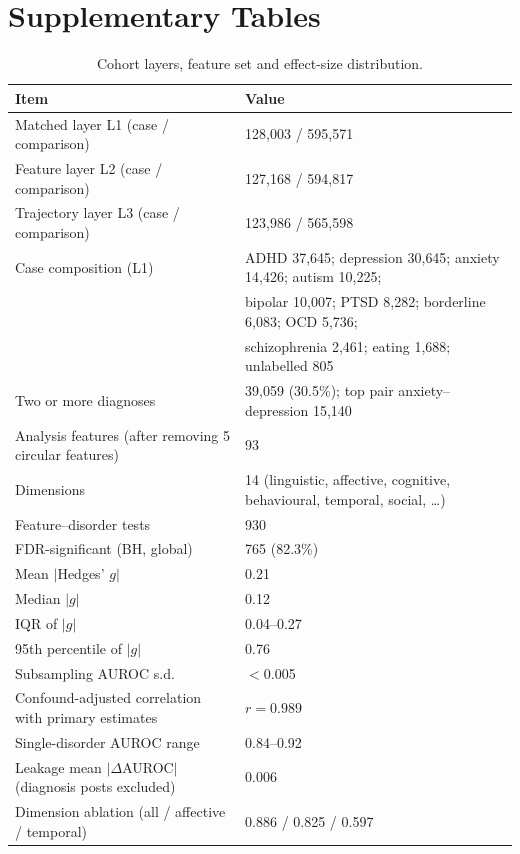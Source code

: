 \documentclass[11pt]{article}
\begin{document}
\section*{Supplementary Tables}

\begin{table}[h]\centering\small
\caption{Cohort layers, feature set and effect-size distribution.}
\label{tab:st1}
\begin{tabular}{ll}
\toprule
Item & Value \\
\midrule
Matched layer L1 (case / comparison) & 128{,}003 / 595{,}571 \\
Feature layer L2 (case / comparison) & 127{,}168 / 594{,}817 \\
Trajectory layer L3 (case / comparison) & 123{,}986 / 565{,}598 \\
Case composition (L1) & ADHD 37{,}645; depression 30{,}645; anxiety 14{,}426; autism 10{,}225; \\
 & bipolar 10{,}007; PTSD 8{,}282; borderline 6{,}083; OCD 5{,}736; \\
 & schizophrenia 2{,}461; eating 1{,}688; unlabelled 805 \\
Two or more diagnoses & 39{,}059 (30.5\%); top pair anxiety--depression 15{,}140 \\
Analysis features (after removing 5 circular features) & 93 \\
Dimensions & 14 (linguistic, affective, cognitive, behavioural, temporal, social, \ldots) \\
Feature--disorder tests & 930 \\
FDR-significant (BH, global) & 765 (82.3\%) \\
Mean $|$Hedges' $g|$ & 0.21 \\
Median $|g|$ & 0.12 \\
IQR of $|g|$ & 0.04--0.27 \\
95th percentile of $|g|$ & 0.76 \\
Subsampling AUROC s.d. & $<$0.005 \\
Confound-adjusted correlation with primary estimates & $r=0.989$ \\
Single-disorder AUROC range & 0.84--0.92 \\
Leakage mean $|\Delta$AUROC$|$ (diagnosis posts excluded) & 0.006 \\
Dimension ablation (all / affective / temporal) & 0.886 / 0.825 / 0.597 \\
\bottomrule
\end{tabular}
\end{table}
\end{document}
